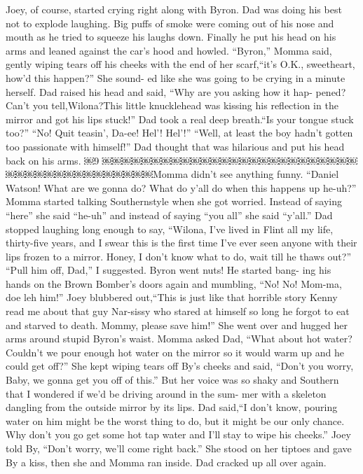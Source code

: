 \documentclass{standard}
\begin{document}
Joey, of course, started crying right along with Byron.
Dad was doing his best not to explode laughing. Big puffs of smoke were coming out of his nose and mouth as he tried to squeeze his laughs down. Finally he put his head on his arms and leaned against the car’s hood and howled.
“Byron,” Momma said, gently wiping tears off his cheeks with the end of her scarf,“it’s O.K., sweetheart, how’d this happen?” She sound- ed like she was going to be crying in a minute herself.
Dad raised his head and said, “Why are you asking how it hap- pened? Can’t you tell,Wilona?This little knucklehead was kissing his reflection in the mirror and got his lips stuck!” Dad took a real deep breath.“Is your tongue stuck too?”
“No! Quit teasin’, Da-ee! Hel’! Hel’!”
“Well, at least the boy hadn’t gotten too passionate with himself!” Dad thought that was hilarious and put his head back on his arms.
￼9
￼￼￼￼￼￼￼￼￼￼￼￼￼￼￼￼￼￼￼￼￼￼￼￼￼￼￼￼￼￼￼￼￼￼￼￼￼￼￼￼￼Momma didn’t see anything funny. “Daniel Watson! What are we gonna do? What do y’all do when this happens up he-uh?” Momma started talking Southernstyle when she got worried. Instead of saying “here” she said “he-uh” and instead of saying “you all” she said “y’all.”
Dad stopped laughing long enough to say, “Wilona, I’ve lived in Flint all my life, thirty-five years, and I swear this is the first time I’ve ever seen anyone with their lips frozen to a mirror. Honey, I don’t know what to do, wait till he thaws out?”
“Pull him off, Dad,” I suggested. Byron went nuts! He started bang- ing his hands on the Brown Bomber’s doors again and mumbling, “No! No! Mom-ma, doe leh him!”
Joey blubbered out,“This is just like that horrible story Kenny read me about that guy Nar-sissy who stared at himself so long he forgot to eat and starved to death. Mommy, please save him!” She went over and hugged her arms around stupid Byron’s waist.
Momma asked Dad, “What about hot water? Couldn’t we pour enough hot water on the mirror so it would warm up and he could get off?” She kept wiping tears off By’s cheeks and said, “Don’t you worry, Baby, we gonna get you off of this.” But her voice was so shaky and Southern that I wondered if we’d be driving around in the sum- mer with a skeleton dangling from the outside mirror by its lips.
Dad said,“I don’t know, pouring water on him might be the worst thing to do, but it might be our only chance. Why don’t you go get some hot tap water and I’ll stay to wipe his cheeks.”
Joey told By, “Don’t worry, we’ll come right back.” She stood on her tiptoes and gave By a kiss, then she and Momma ran inside. Dad cracked up all over again.
\end{document}
